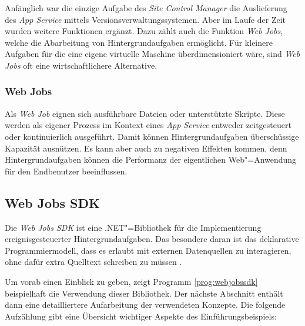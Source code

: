 Anfänglich war die einzige Aufgabe des \textit{Site Control Manager} die Auslieferung des \textit{App Service} mittels Versionsverwaltungssystemen. Aber im Laufe der Zeit wurden weitere Funktionen ergänzt. Dazu zählt auch die Funktion \textit{Web Jobs}, welche die Abarbeitung von Hintergrundaufgaben ermöglicht. Für kleinere Aufgaben für die eine eigene virtuelle Maschine überdimensioniert wäre, sind \textit{Web Jobs} oft eine wirtschaftlichere Alternative.

\subsubsection{Web Jobs}

Als \textit{Web Job} eignen sich ausführbare Dateien oder unterstützte Skripte. Diese werden als eigener Prozess im Kontext eines \textit{App Service} entweder zeitgesteuert oder kontinuierlich ausgeführt. Damit können Hintergrundaufgaben überschüssige Kapazität ausnützen. Es kann aber auch zu negativen Effekten kommen, denn Hintergrundaufgaben können die Performanz der eigentlichen Web"=Anwendung für den Endbenutzer beeinflussen.

\subsection{Web Jobs SDK}

Die \textit{Web Jobs SDK} ist eine .NET"=Bibliothek für die Implementierung ereignisgesteuerter Hintergrundaufgaben. Das besondere daran ist das deklarative Programmiermodell, dass es erlaubt mit externen Datenquellen zu interagieren, ohne dafür extra Quelltext schreiben zu müssen \cite{WebJobsSdkBindingAttributes}.

Um vorab einen Einblick zu geben, zeigt Programm \ref{prog:webjobssdk} beispielhaft die Verwendung dieser Bibliothek. Der nächste Abschnitt enthält dann eine detailliertere Aufarbeitung der verwendeten Konzepte. Die folgende Aufzählung gibt eine Übersicht wichtiger Aspekte des Einführungsbeispiels:

